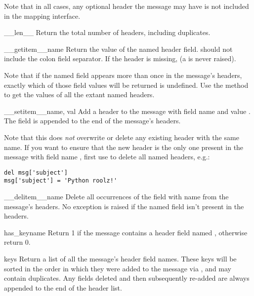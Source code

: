 \documentclass{howto}
\begin{document}
Note that in all cases, any optional  header the message
may have is not included in the mapping interface.

\begin{methoddesc}[Message]{__len__}{}
Return the total number of headers, including duplicates.
\end{methoddesc}

\begin{methoddesc}[Message]{__getitem__}{name}
Return the value of the named header field.   should not
include the colon field separator.  If the header is missing,
 (a  is never raised).

Note that if the named field appears more than once in the message's
headers, exactly which of those field values will be returned is
undefined.  Use the  method to get the values of all
the extant named headers.
\end{methoddesc}

\begin{methoddesc}[Message]{__setitem__}{name, val}
Add a header to the message with field name  and value
.  The field is appended to the end of the message's headers.

Note that this does \emph{not} overwrite or delete any existing header
with the same name.  If you want to ensure that the new header is the
only one present in the message with field name
, first use  to delete all named
headers, e.g.:

\begin{verbatim}
del msg['subject']
msg['subject'] = 'Python roolz!'
\end{verbatim}
\end{methoddesc}

\begin{methoddesc}[Message]{__delitem__}{name}
Delete all occurrences of the field with name  from the
message's headers.  No exception is raised if the named field isn't
present in the headers.
\end{methoddesc}

\begin{methoddesc}[Message]{has_key}{name}
Return 1 if the message contains a header field named ,
otherwise return 0.
\end{methoddesc}

\begin{methoddesc}[Message]{keys}{}
Return a list of all the message's header field names.  These keys
will be sorted in the order in which they were added to the message
via , and may contain duplicates.  Any fields
deleted and then subsequently re-added are always appended to the end
of the header list.
\end{methoddesc}
\end{document}
